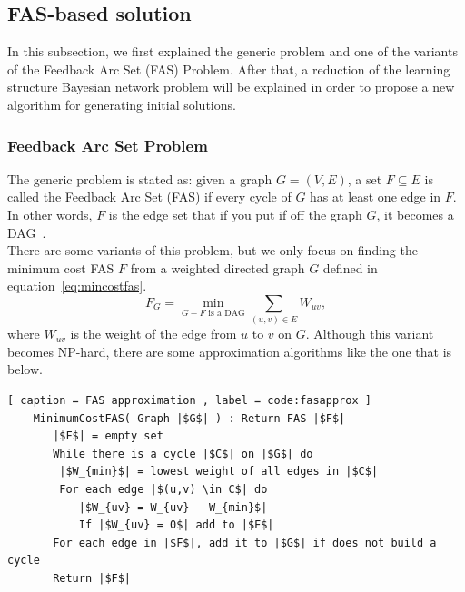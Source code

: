\subsection{FAS-based solution}
\label{subsec:fasapproach}

In this subsection, we first explained the generic problem and one of the variants of the Feedback Arc Set (FAS) Problem. After that, a reduction of the learning structure Bayesian network problem will be explained in order to propose a new algorithm for generating initial solutions.

\subsubsection{Feedback Arc Set Problem} \label{subsub:fasp}

The generic problem is stated as: given a graph $G = ( V , E )$, a set $F \subseteq E$ is called the Feedback Arc Set (FAS) if every cycle of $G$ has at least one edge in $F$. In other words, $F$ is the edge set that if you put if off the graph $G$, it becomes a DAG~\cite{DF01}.\\
There are some variants of this problem, but we only focus on finding the minimum cost FAS $F$ from a weighted directed graph $G$ defined in equation~\ref{eq:mincostfas}.
\begin{equation}
	\label{eq:mincostfas}
	F_{G} = \min_{G - F \text{ is a DAG}} \sum_{(u,v) \in E} W_{uv} ,
\end{equation}
where $W_{uv}$ is the weight of the edge from $u$ to $v$ on $G$. Although this variant becomes NP-hard, there are some approximation algorithms like the one that is below.
\begin{lstlisting}[ caption = FAS approximation , label = code:fasapprox ]
	MinimumCostFAS( Graph |$G$| ) : Return FAS |$F$|
	   |$F$| = empty set
	   While there is a cycle |$C$| on |$G$| do
	   	|$W_{min}$| = lowest weight of all edges in |$C$|
		For each edge |$(u,v) \in C$| do
		   |$W_{uv} = W_{uv} - W_{min}$|
		   If |$W_{uv} = 0$| add to |$F$|
	   For each edge in |$F$|, add it to |$G$| if does not build a cycle
	   Return |$F$|
\end{lstlisting}

